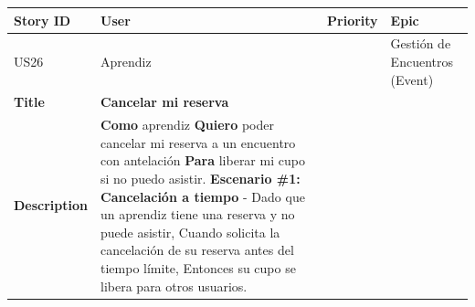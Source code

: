 {\def\LTcaptype{none} %
\begin{longtable}[]{@{}
  >{\raggedright\arraybackslash}p{}
  >{\raggedright\arraybackslash}p{}
  >{\raggedright\arraybackslash}p{}
  >{\raggedright\arraybackslash}p{}@{}}
\toprule\noalign{}
\begin{minipage}[b]{\linewidth}\raggedright
Story ID
\end{minipage} & \begin{minipage}[b]{\linewidth}\raggedright
User
\end{minipage} & \begin{minipage}[b]{\linewidth}\raggedright
Priority
\end{minipage} & \begin{minipage}[b]{\linewidth}\raggedright
Epic
\end{minipage} \\
\midrule\noalign{}
\endhead
\bottomrule\noalign{}
\endlastfoot
US26 & Aprendiz & 3 & Gestión de Encuentros (Event) \\
\textbf{Title} & \textbf{Cancelar mi reserva} & & \\
\textbf{Description} & \textbf{Como} aprendiz \textbf{Quiero} poder
cancelar mi reserva a un encuentro con antelación \textbf{Para} liberar
mi cupo si no puedo asistir. \textbf{Escenario \#1: Cancelación a
tiempo} - Dado que un aprendiz tiene una reserva y no puede asistir,
Cuando solicita la cancelación de su reserva antes del tiempo límite,
Entonces su cupo se libera para otros usuarios. & & \\
\end{longtable}
}

